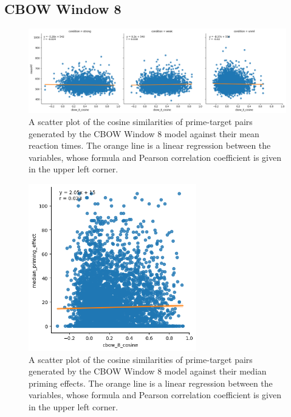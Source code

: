 \documentclass{IEEEtran}
\begin{document}
\subsection*{CBOW Window 8}
\begin{figure}[h]
    \centering
    \includegraphics[width=\textwidth]{images/cbow_8_cosine_against_meanrt.png}
    \caption{A scatter plot of the cosine similarities of prime-target pairs generated by the CBOW Window 8 model against their mean reaction times. The orange line is a linear regression between the variables, whose formula and Pearson correlation coefficient is given in the upper left corner.}
\end{figure}
\begin{figure}[h]
    \centering
    \includegraphics[width=0.65\textwidth]{images/cbow_8_cosine_against_priming_effect.png}
    \caption{A scatter plot of the cosine similarities of prime-target pairs generated by the CBOW Window 8 model against their median priming effects. The orange line is a linear regression between the variables, whose formula and Pearson correlation coefficient is given in the upper left corner.}
\end{figure}

\newpage
\end{document}
